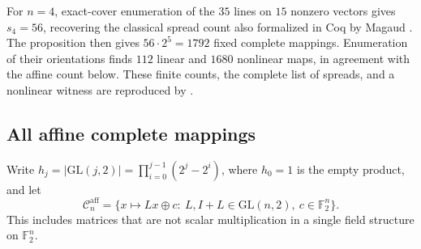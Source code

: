 \documentclass[11pt]{article}
\begin{document}
For $n=4$, exact-cover enumeration of the $35$ lines on $15$ nonzero vectors
gives $s_4=56$, recovering the classical spread count also formalized in
Coq by Magaud \cite{Mag22}. The proposition then gives $56\cdot2^5=1792$ fixed
complete mappings. Enumeration of their orientations finds $112$ linear
and $1680$ nonlinear maps, in agreement with the affine count below.
These finite counts, the complete list of spreads, and a nonlinear witness
are reproduced by .

\subsection*{All affine complete mappings}
Write $h_j=|\mathrm{GL}(j,2)|=\prod_{i=0}^{j-1}(2^j-2^i)$,
where $h_0=1$ is the empty product,
and let
\[
\mathcal C_n^{\mathrm{aff}}
=\{x\mapsto Lx\oplus c:\ L,I+L\in\mathrm{GL}(n,2),\ c\in\mathbb F_2^n\}.
\]
This includes matrices that are not scalar multiplication in a single
field structure on $\mathbb F_2^n$.
\end{document}
